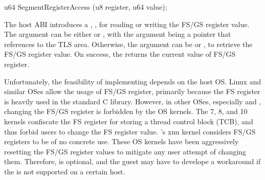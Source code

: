 \begin{paldef}
u64 SegmentRegisterAccess (u8 register, u64 value);
\end{paldef}




The host ABI introduces a \hostapi{}, , for reading or writing the FS/GS register value.
The  argument can be either  or ,
with the  argument
being a pointer that references to the TLS area.
Otherwise, the  argument
can be  or ,
to retrieve the FS/GS register value.
On success, the \hostapi{} returns the current value of FS/GS register.



Unfortunately, the feasibility of implementing 
depends on the host OS.
Linux and similar OSes allow the usage of FS/GS register,
primarily because the FS register is heavily used in the standard C library.
However, in other OSes, especially \win{} and \osx{},
changing the FS/GS register %
is forbidden by the OS kernels.
The \win{} 7, 8, and 10 kernels confiscate the FS register for storing a thread control block (TCB),
and thus forbid users to change the FS register value.
\osx{}'s xnu kernel considers FS/GS registers to be of no concrete use.
These OS kernels
have been aggressively resetting the FS/GS register values
to mitigate any user attempt of changing them.
Therefore, 
is optional,
and the guest may have to develope a workaround if the \hostapi{} is not supported on a certain host.





